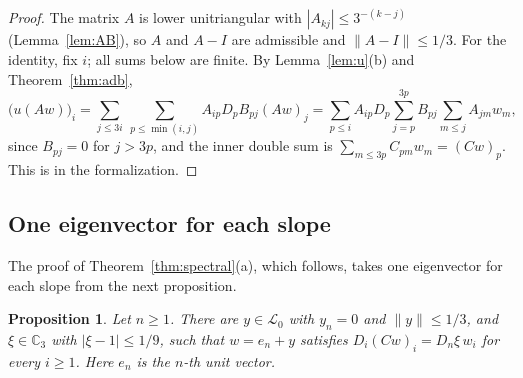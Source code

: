 \documentclass[11pt]{amsart}
\newtheorem{proposition}[theorem]{Proposition}
\theoremstyle{definition}
\numberwithin{equation}{section}
\newcommand{\lean}[1]{\ignorespaces}
\newcommand{\Cp}{\mathbb{C}_3}
\newcommand{\Lc}{\mathcal{L}_0}
\begin{document}
\begin{proof}
The matrix $A$ is lower unitriangular with $|A_{kj}|\le3^{-(k-j)}$ (Lemma~\ref{lem:AB}), so $A$ and $A-I$ are admissible and $\|A-I\|\le1/3$. For the identity, fix $i$; all sums below are finite. By Lemma~\ref{lem:u}(b) and Theorem~\ref{thm:adb},
\[
\bigl(u(Aw)\bigr)_i=\sum_{j\le3i}\ \sum_{p\le\min(i,j)}A_{ip}D_pB_{pj}(Aw)_j=\sum_{p\le i}A_{ip}D_p\sum_{j=p}^{3p}B_{pj}\sum_{m\le j}A_{jm}w_m,
\]
since $B_{pj}=0$ for $j>3p$, and the inner double sum is $\sum_{m\le3p}C_{pm}w_m=(Cw)_p$. This is  in the formalization.
\end{proof}

\subsection{One eigenvector for each slope}
The proof of Theorem~\ref{thm:spectral}(a), which follows, takes one eigenvector for each slope from the next proposition.

\begin{proposition}\label{prop:DC}\lean{CalegariSlopes.Spectral.exists_eigen_DC}
Let $n\ge1$. There are $y\in\Lc$ with $y_n=0$ and $\|y\|\le1/3$, and $\xi\in\Cp$ with $|\xi-1|\le1/9$, such that $w=e_n+y$ satisfies $D_i(Cw)_i=D_n\xi\,w_i$ for every $i\ge1$. Here $e_n$ is the $n$-th unit vector.
\end{proposition}
\end{document}
